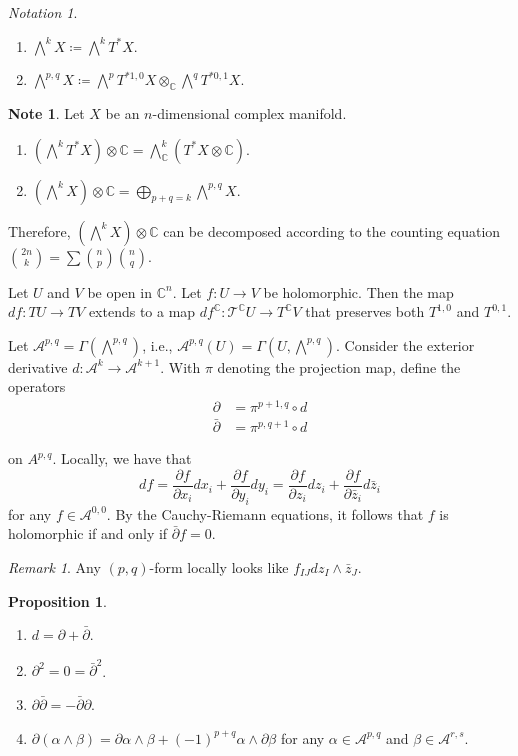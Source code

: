 \documentclass[10pt,letterpaper,cm]{nupset}
\theoremstyle{definition}
\newtheorem{note}[defn]{Note}
\theoremstyle{theorem}
\newtheorem{prop}[defn]{Proposition}
\theoremstyle{remark}
\newtheorem{remark}[defn]{Remark}
\newtheorem*{notation}{Notation}
\newcommand{\A}{\mathcal A}
\newcommand{\C}{\mathbb C}
\newcommand{\T}{\mathcal T}
\newcommand{\1}{\mathbb{1}}
\newcommand{\0}{\vec 0}
\newcommand{\be}{\begin{enumerate}}
\newcommand{\ee}{\end{enumerate}}
\begin{document}
\begin{notation} $ $
\be
\item $\bigwedge^k{X} \coloneqq \bigwedge^k{T^{\ast}{X}}$.
\item $\bigwedge^{p,q}{X} \coloneqq \bigwedge^p{T^{\ast{1,0}}}{X} \otimes_{\C} \bigwedge^q{T^{\ast{0,1}}}{X}$.
\ee
\end{notation}

\begin{note}\label{decomp} Let $X$ be an $n$-dimensional complex manifold.
\be
\item $\left(\bigwedge^k{T^{\ast}{X}}\right) \otimes \C = \bigwedge^k_{\C}\left(T^{\ast}{X} \otimes \C\right)$.
\item $\left(\bigwedge^k{X}\right) \otimes \C = \bigoplus_{p+q = k} \bigwedge^{p,q}{X}$.
\ee
\end{note}

Therefore,  $\left(\bigwedge^k{X}\right) \otimes \C$ can be decomposed according to the counting equation ${2n \choose k} = \sum{{n\choose p}{n\choose q}}$.

\medskip

Let $U$ and $V$ be open  in $\C^n$. Let $f: U \to V$ be holomorphic. Then the map $d{f} : T{U} \to T{V}$ extends to a map $d{f}^{\C} : \T^{\C}{U} \to T^{\C}{V}$ that preserves both $T^{1,0}$ and $T^{0,1}$. 

\medskip

Let $\A^{p,q}  = \Gamma\left(\bigwedge^{p,q}\right)$, i.e., $\A^{p,q}\left(U\right) = \Gamma\left(U, \bigwedge^{p,q}\right)$. Consider the exterior derivative $d: \A^k \to \A^{k+1}$. With $\pi$ denoting the projection map, define the operators
\begin{align*}
\partial & = \pi^{p+1, q} \circ d
\\ \bar{\partial}  & = \pi^{p, q+1} \circ d
\end{align*}

on $A^{p,q}$. Locally, we have that $$df = \frac{\partial{f}}{\partial{x_i}}d{x_i} + \frac{\partial{f}}{\partial{y_i}}d{y_i} = \frac{\partial{f}}{\partial{z_i}}d{z_i} + \frac{\partial{f}}{\partial{\bar{z}_i}}d{\bar{z}_i} $$ for any $f\in \A^{0,0}$.  By the Cauchy-Riemann equations, it follows that $f$ is holomorphic if and only if $\bar{\partial}{f} = 0$.

\begin{remark}
Any $\left(p,q\right)$-form locally looks like $f_{IJ}d{z_I}\wedge \bar{z}_J$.
\end{remark}

\begin{prop} $ $
\be
\item $d = \partial + \bar{\partial}$.
\item $\partial^2 =0 = \bar{\partial}^2$. 
\item $\partial{\bar{\partial}} = {-\bar{\partial}{\partial}}$.
\item $\partial\left(\alpha \wedge \beta\right) = \partial{\alpha} \wedge \beta + \left({-1}\right)^{p+q} \alpha \wedge \partial{\beta}$ for any $\alpha \in \A^{p,q}$ and $\beta \in \A^{r,s}$.
\ee
\end{prop}
\end{document}

